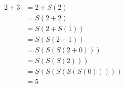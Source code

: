\documentclass[preview]{standalone}
\begin{document}
\begin{align*}
2 + 3 &= 2 + S(2) \\ &= S(2 + 2) \\ &= S(2 + S(1)) \\ &= S(S(2 + 1)) \\ &= S(S(S(2 + 0))) \\ &= S(S(S(2))) \\ &= S(S(S(S(S(0))))) \\ &= 5
\end{align*}
\end{document}
